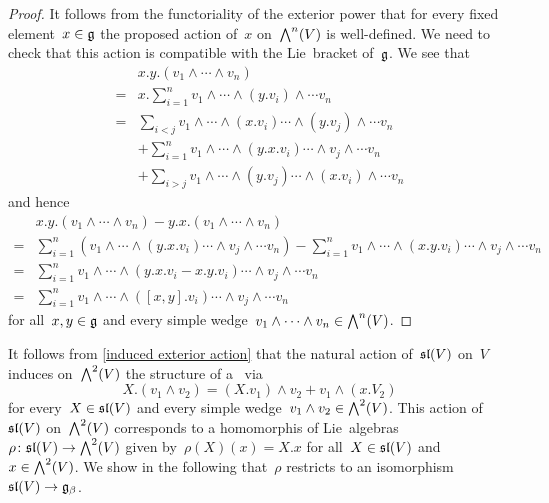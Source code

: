 \begin{proof}
  It follows from the functoriality of the exterior power that for every fixed element~$x \in \mathfrak{g}$ the proposed action of~$x$ on~$\exterior[n]{V}$ is well-defined.
  We need to check that this action is compatible with the Lie~bracket of~$\mathfrak{g}$.
  We see that
  \begin{align*}
    {}&
    x.y.(v_1 \wedge \dotsb \wedge v_n)
    \\
    ={}&
    x. \sum_{i=1}^n v_1 \wedge \dotsb \wedge (y.v_i) \wedge \dotsb v_n
    \\
    ={}&
    \sum_{i < j}  v_1 \wedge \dotsb \wedge (x.v_i) \dotsb \wedge (y.v_j) \wedge \dotsb v_n
    \\
    {}&
    + \sum_{i=1}^n  v_1 \wedge \dotsb \wedge (y.x.v_i) \dotsb \wedge v_j \wedge \dotsb v_n
    \\
    {}&
    + \sum_{i > j}  v_1 \wedge \dotsb \wedge (y.v_j) \dotsb \wedge (x.v_i) \wedge \dotsb v_n
  \end{align*}
  and hence
  \begin{align*}
    {}&
    x.y.(v_1 \wedge \dotsb \wedge v_n) - y.x.(v_1 \wedge \dotsb \wedge v_n)
    \\
    ={}&
    \sum_{i=1}^n  (v_1 \wedge \dotsb \wedge (y.x.v_i) \dotsb \wedge v_j \wedge \dotsb v_n)
    -
    \sum_{i=1}^n  v_1 \wedge \dotsb \wedge (x.y.v_i) \dotsb \wedge v_j \wedge \dotsb v_n
    \\
    ={}&
    \sum_{i=1}^n  v_1 \wedge \dotsb \wedge (y.x.v_i - x.y.v_i) \dotsb \wedge v_j \wedge \dotsb v_n
    \\
    ={}&
    \sum_{i=1}^n  v_1  \wedge \dotsb \wedge ([x,y].v_i) \dotsb \wedge v_j \wedge \dotsb v_n
  \end{align*}
  for all~$x, y \in \mathfrak{g}$ and every simple wedge~$v_1 \wedge \dotsb \wedge v_n \in \exterior[n]{V}$.
\end{proof}

It follows from \cref{induced exterior action} that the natural action of~$\mathfrak{sl}(V)$ on~$V$ induces on~$\exterior[2]{V}$ the structure of a~{} via
\[
  X.(v_1 \wedge v_2)
  =
  (X.v_1) \wedge v_2 + v_1 \wedge (x.V_2)
\]
for every~$X \in \mathfrak{sl}(V)$ and every simple wedge~$v_1 \wedge v_2 \in \exterior[2]{V}$.
This action of~$\mathfrak{sl}(V)$ on~$\exterior[2]{V}$ corresponds to a homomorphis of Lie~algebras~$\rho \colon \sllie(V) \to \exterior[2]{V}$ given by~$\rho(X)(x) = X.x$ for all~$X \in \mathfrak{sl}(V)$ and~$x \in \exterior[2]{V}$.
We show in the following that~$\rho$ restricts to an isomorphism~$\mathfrak{sl}(V) \to \mathfrak{g}_\beta$.

